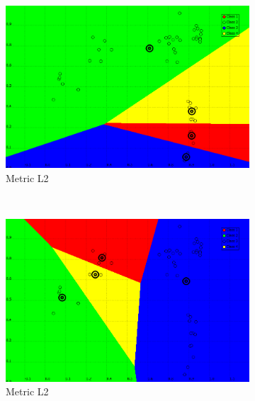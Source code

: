 \documentclass[a4paper,10pt]{article}
\begin{document}
\begin{figure}[H]
\centering
    \begin{subfigure}[t]{0.2\textwidth}
      \centering
      \includegraphics[width=\textwidth]{pictures/dataset_1_Kmeans-4K-L2-wrong}
      \caption{Metric L2}
      \label{fig:dataset_1_Kmeans-4K-L2-bad}
     \end{subfigure}
      ~
    \begin{subfigure}[t]{0.2\textwidth}
      \centering
      \includegraphics[width=\textwidth]{pictures/dataset_1_Kmeans-4K-L2-wrong2}
      \caption{Metric L2}
      \label{fig:dataset_1_Kmeans-4K-L2-wrong2}
     \end{subfigure}
      ~
    \begin{subfigure}[t]{0.2\textwidth}
      \centering

\end{subfigure}
\end{figure}
\end{document}
